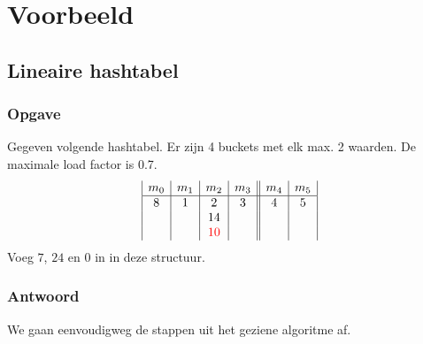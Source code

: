 \documentclass[hashing.tex]{subfiles}
\begin{document}
\chapter{Voorbeeld}
\renewcommand\thesection{V\arabic{section}}
\renewcommand\thesubsection{V\arabic{section}}
\section{Lineaire hashtabel}
\subsection*{Opgave}
Gegeven volgende hashtabel. Er zijn 4 buckets met elk max. 2 waarden. De maximale load factor is 0.7.
\[
\begin{array}{|c|c|c|c||c|c|}
m_0&m_1&m_2&m_3&m_4&m_5\\
\hline
8 & 1 & 2 & 3 & 4 & 5\\
  &   & 14&   &   &\\
  &   & \color{red}10 & & &
\end{array} 
\]
Voeg $7$, $24$ en $0$ in in deze structuur.
\subsection*{Antwoord}
We gaan eenvoudigweg de stappen uit het geziene algoritme af.
\end{document}
